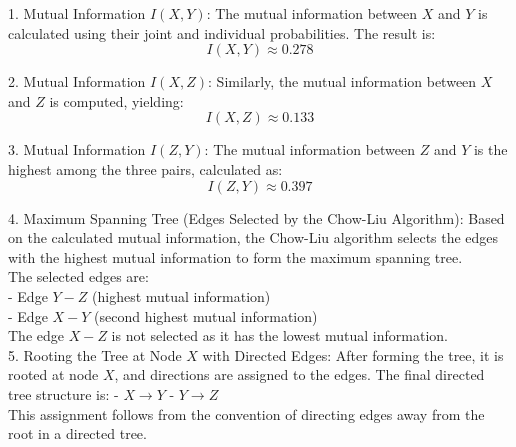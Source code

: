 \documentclass[a4paper]{article}
\theoremstyle{definition}
\newenvironment{soln}{
	\leavevmode\color{blue}\ignorespaces
}{}
\begin{document}
\begin{soln}
	1. Mutual Information \(I(X, Y)\):
   The mutual information between \(X\) and \(Y\) is calculated using their joint and individual probabilities. The result is:
   \[ I(X, Y) \approx 0.278 \]

2. Mutual Information \(I(X, Z)\):
   Similarly, the mutual information between \(X\) and \(Z\) is computed, yielding:
   \[ I(X, Z) \approx 0.133 \]

3. Mutual Information \(I(Z, Y)\):
   The mutual information between \(Z\) and \(Y\) is the highest among the three pairs, calculated as:
   \[ I(Z, Y) \approx 0.397 \]

4. Maximum Spanning Tree (Edges Selected by the Chow-Liu Algorithm):
   Based on the calculated mutual information, the Chow-Liu algorithm selects the edges with the highest mutual information to form the maximum spanning tree.\\
   The selected edges are:\\
   
   - Edge \(Y-Z\) (highest mutual information)\\
   - Edge \(X-Y\) (second highest mutual information)\\
   
   The edge \(X-Z\) is not selected as it has the lowest mutual information.\\

5. Rooting the Tree at Node \(X\) with Directed Edges:
   After forming the tree, it is rooted at node \(X\), and directions are assigned to the edges. The final directed tree structure is:
   - \(X \rightarrow Y\)
   - \(Y \rightarrow Z\)\\

   This assignment follows from the convention of directing edges away from the root in a directed tree.
\end{soln}

	
	
\end{document}
